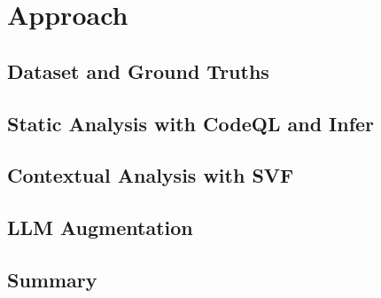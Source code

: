 \section{Approach}
\label{sec:approach}


\subsection{Dataset and Ground Truths}
\label{sec:approach:sub:dataset}


\subsection{Static Analysis with CodeQL and Infer}
\label{sec:approach:sub:sast}


\subsection{Contextual Analysis with SVF}
\label{sec:approach:sub:context}


\subsection{LLM Augmentation}
\label{sec:approach:sub:llm}


\subsection{Summary}
\label{sec:approach:sub:summary}
